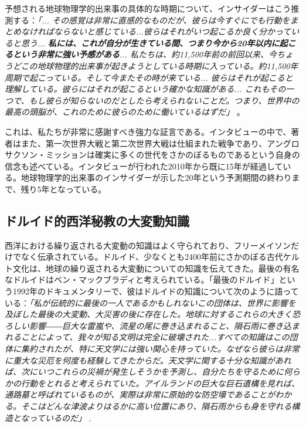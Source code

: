 \documentclass[10pt,twocolumn,letterpaper]{article}
\begin{document}
予想される地球物理学的出来事の具体的な時期について、インサイダーはこう推測する：\textit{「... その感覚は非常に直感的なものだが、彼らは今すぐにでも行動をまとめなければならないと感じている...彼らはそれがいつ起こるか良く分かっていると思う... \textbf{私には、これが自分が生きている間、つまり今から20年以内に起こるという非常に強い予感がある}... 私たちは、約11,500年前の前回以来、今ちょうどこの地球物理的出来事が起きようとしている時期に入っている。約11,500年周期で起こっている。そして今またその時が来ている... 彼らはそれが起こると理解している。彼らにはそれが起こるという確かな知識がある... これもその一つで、もし彼らが知らないのだとしたら考えられないことだ。つまり、世界中の最高の頭脳が、これのために彼らのために働いているはずだ」} \cite{4}。

これは、私たちが非常に感謝すべき強力な証言である。インタビューの中で、著者はまた、第一次世界大戦と第二次世界大戦は仕組まれた戦争であり、アングロサクソン・ミッションは確実に多くの世代をさかのぼるものであるという自身の信念も述べている。インタビューが行われた2010年から既に15年が経過している。地球物理学的出来事のインサイダーが示した20年という予測期間の終わりまで、残り5年となっている。

\subsection{ドルイド的西洋秘教の大変動知識}

西洋における繰り返される大変動の知識はよく守られており、フリーメイソンだけでなく伝承されている。ドルイド、少なくとも2400年前にさかのぼる古代ケルト文化は\cite{7}、地球の繰り返される大変動についての知識を伝えてきた。最後の有名なドルイドはベン・マックブラディと考えられている。「最後のドルイド」という1992年のドキュメンタリーで、彼はドルイドの知識について次のように語っている：\textit{「私が伝統的に最後の一人であるかもしれないこの団体は、世界に影響を及ぼした最後の大変動、大災害の後に存在した。地球に対するこれらの大きく恐ろしい影響――巨大な雷嵐や、流星の尾に巻き込まれること、隕石雨に巻き込まれることによって、我々が知る文明は完全に破壊された...すべての知識はこの団体に集約されたが、特に天文学には強い関心を持っていた。なぜなら彼らは非常に重大な災厄を何度も経験してきたからだ。天文学に関する十分な知識があれば、次にいつこれらの災禍が発生しそうかを予測し、自分たちを守るために何らかの行動をとれると考えられていた。アイルランドの巨大な巨石遺構を見れば、通路墓と呼ばれているものが、実際は非常に原始的な防空壕であることがわかる。そこはどんな津波よりはるかに高い位置にあり、隕石雨からも身を守れる構造となっているのだ」} \cite{8,9}.
\end{document}
